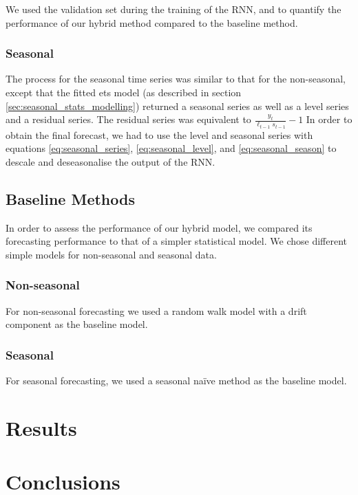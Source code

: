 \documentclass[a4paper,12pt]{article}
\theoremstyle{definition}
\begin{document}
We used the validation set during the training of the RNN, and to quantify the performance of our hybrid method compared to the baseline method.

\subsubsection{Seasonal}
The process for the seasonal time series was similar to that for the non-seasonal, except that the fitted ets model (as described in section \ref{sec:seasonal_stats_modelling}) returned a seasonal series as well as a level series and a residual series. The residual series was equivalent to $\frac{y_t}{\ell_{t-1}s_{t-1}} - 1$ In order to obtain the final forecast, we had to use the level and seasonal series with equations \ref{eq:seasonal_series}, \ref{eq:seasonal_level}, and \ref{eq:seasonal_season} to descale and deseasonalise the output of the RNN.

\subsection{Baseline Methods}
In order to assess the performance of our hybrid model, we compared its forecasting performance to that of a simpler statistical model. We chose different simple models for non-seasonal and seasonal data.

\subsubsection{Non-seasonal}
For non-seasonal forecasting we used a random walk model with a drift component as the baseline model.

\subsubsection{Seasonal}
For seasonal forecasting, we used a seasonal na{\"i}ve method as the baseline model.


\section{Results}

\section{Conclusions}

\newpage


\end{document}
